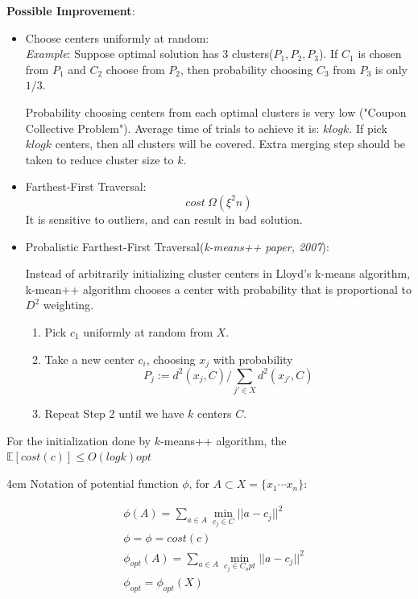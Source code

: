 \textbf{Possible Improvement}:
\begin{itemize}
\item Choose centers uniformly at random:\\
  \textit{Example}: Suppose optimal solution has 3 clusters($P_1,P_2,
  P_3$). If $C_1$ is chosen from $P_1$ and $C_2$ choose from $P_2$,
  then probability choosing $C_3$ from $P_3$ is only $1/3$.
  
  Probability choosing centers from each optimal clusters is very low
  ("Coupon Collective Problem"). Average time of trials to achieve it
  is: $klogk$. If pick $klogk$ centers, then all clusters will be
  covered. Extra merging step should be taken to reduce cluster size
  to $k$. 
  
\item Farthest-First Traversal:\\
  $$cost ~ \Omega(\xi^2n)$$
  It is sensitive to outliers, and can result in bad solution.
  
\item Probalistic Farthest-First Traversal(\textit{k-means++ paper, 2007}):

Instead of arbitrarily initializing cluster centers in Lloyd's k-means
algorithm, k-mean++ algorithm chooses a center with probability that
is proportional to $D^2$ weighting.

  \begin{enumerate}
  \item Pick $c_1$ uniformly at random from $X$.
  \item Take a new center $c_i$, choosing $x_j$ with probability
    \[P_j:=d^2(x_j,C)/\sum_{j'\in X}d^2(x_{j'},C)\]
  \item Repeat Step 2 until we have $k$ centers $C$.
  \end{enumerate}
\end{itemize}

\begin{theorem}
  For the initialization done by $k$-means++ algorithm, the
  $\mathbb{E}[cost(c)] \leq O(logk)opt$ 
\end{theorem}

\begingroup\leftskip4em
Notation of potential function $\phi$, for $A\subset X=\{x_1\cdots
x_n\}$:  
\par\endgroup
\begin{align*}			
  &\phi(A) = \sum_{a\in A} \min_{c_j\in C} ||a-c_j||^2\\
  &\phi = \phi = cost(c)\\
  &\phi_{opt}(A)=  \sum_{a\in A} \min_{c_j\in C_opt} ||a-c_j||^2\\
  &\phi_{opt} = \phi_{opt}(X)
\end{align*}

